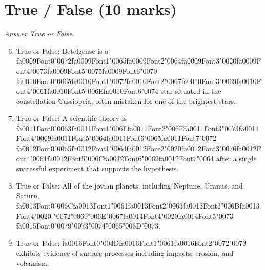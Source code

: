 \documentclass[12pt]{article}
\begin{document}
\section*{True / False (10 marks)}
\textit{Answer True or False}
\begin{enumerate}[label=\arabic*.]
\setcounter{enumi}{5}
\item True or False: Betelgeuse is a {\csname fa0009Font0\endcsname\char"0072}{\csname fa0009Font1\endcsname\char"0065}{\csname fa0009Font2\endcsname\char"0064}{\csname fa0009Font3\endcsname\char"0020}{\csname fa0009Font4\endcsname\char"0073}{\csname fa0009Font5\endcsname\char"0075}{\csname fa0009Font6\endcsname\char"0070} {\csname fa0010Font0\endcsname\char"0065}{\csname fa0010Font1\endcsname\char"0072}{\csname fa0010Font2\endcsname\char"0067}{\csname fa0010Font3\endcsname\char"0069}{\csname fa0010Font4\endcsname\char"0061}{\csname fa0010Font5\endcsname\char"006E}{\csname fa0010Font6\endcsname\char"0074} star situated in the constellation Cassiopeia, often mistaken for one of the brightest stars.
\item True or False: A scientific theory is {\csname fa0011Font0\endcsname\char"0063}{\csname fa0011Font1\endcsname\char"006F}{\csname fa0011Font2\endcsname\char"006E}{\csname fa0011Font3\endcsname\char"0073}{\csname fa0011Font4\endcsname\char"0069}{\csname fa0011Font5\endcsname\char"0064}{\csname fa0011Font6\endcsname\char"0065}{\csname fa0011Font7\endcsname\char"0072} {\csname fa0012Font0\endcsname\char"0065}{\csname fa0012Font1\endcsname\char"0064}{\csname fa0012Font2\endcsname\char"0020}{\csname fa0012Font3\endcsname\char"0076}{\csname fa0012Font4\endcsname\char"0061}{\csname fa0012Font5\endcsname\char"006C}{\csname fa0012Font6\endcsname\char"0069}{\csname fa0012Font7\endcsname\char"0064} after a single successful experiment that supports the hypothesis.
\item True or False: All of the jovian planets, including Neptune, Uranus, and Saturn, {\csname fa0013Font0\endcsname\char"006C}{\csname fa0013Font1\endcsname\char"0061}{\csname fa0013Font2\endcsname\char"0063}{\csname fa0013Font3\endcsname\char"006B}{\csname fa0013Font4\endcsname\char"0020} {\char"0072}{\char"0069}{\char"006E}{\char"0067}{\csname fa0014Font4\endcsname\char"0020}{\csname fa0014Font5\endcsname\char"0073} {\csname fa0015Font0\endcsname\char"0079}{\char"0073}{\char"0074}{\char"0065}{\char"006D}{\char"0073}.
\item True or False: {\csname fa0016Font0\endcsname\char"004D}{\csname fa0016Font1\endcsname\char"0061}{\csname fa0016Font2\endcsname\char"0072}{\char"0073} exhibits evidence of surface processes including impacts, erosion, and volcanism.

\end{enumerate}
\end{document}
